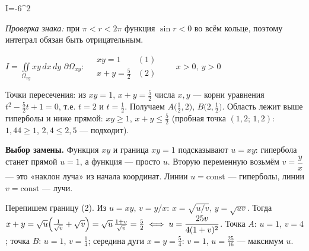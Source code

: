 \begin{answerbox}
I=-6\pi^2
\end{answerbox}

\emph{Проверка знака:} при $\pi<r<2\pi$ функция $\sin r<0$ во всём кольце, поэтому интеграл обязан быть отрицательным. \checkmark


\begin{shapka}
$\displaystyle I=\iint\limits_{\Omega_{xy}}xy\,dx\,dy$
\tcblower
$\partial\Omega_{xy}:\quad
\begin{array}{ll}
xy=1 & (1)\\
x+y=\frac52 & (2)
\end{array}\qquad x>0,\ y>0$
\end{shapka}

Точки пересечения: из $xy=1$, $x+y=\frac52$ числа $x,y$ --- корни уравнения $t^2-\frac52t+1=0$, т.е. $t=2$ и $t=\frac12$. Получаем $A\bigl(\frac12,2\bigr)$, $B\bigl(2,\frac12\bigr)$. Область лежит выше гиперболы и ниже прямой: $xy\geqslant1$, $x+y\leqslant\frac52$ (пробная точка $(1{,}2;\,1{,}2)$: $1{,}44\geqslant1$, $2{,}4\leqslant2{,}5$ --- подходит).

\textbf{Выбор замены.} Функция $xy$ и граница $xy=1$ подсказывают $u=xy$: гипербола станет прямой $u=1$, а функция --- просто $u$. Вторую переменную возьмём $v=\dfrac yx$ --- это «наклон луча» из начала координат. Линии $u=\mathrm{const}$ --- гиперболы, линии $v=\mathrm{const}$ --- лучи.

Перепишем границу (2). Из $u=xy$, $v=y/x$: $x=\sqrt{u/v}$, $y=\sqrt{uv}$. Тогда
$x+y=\sqrt u\Bigl(\frac1{\sqrt v}+\sqrt v\Bigr)=\sqrt u\,\frac{1+v}{\sqrt v}=\frac52\iff u=\dfrac{25v}{4(1+v)^2}$.
Точка $A$: $u=1$, $v=4$; точка $B$: $u=1$, $v=\frac14$; середина дуги $x=y=\frac54$: $v=1$, $u=\frac{25}{16}$ --- максимум $u$.

